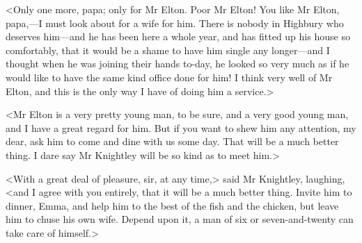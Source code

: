 <Only one more, papa; only for Mr Elton. Poor Mr Elton! You like Mr Elton, papa,—I must look about for a wife for him. There is nobody in Highbury who deserves him—and he has been here a whole year, and has fitted up his house so comfortably, that it would be a shame to have him single any longer—and I thought when he was joining their hands to-day, he looked so very much as if he would like to have the same kind office done for him! I think very well of Mr Elton, and this is the only way I have of doing him a service.>

<Mr Elton is a very pretty young man, to be sure, and a very good young man, and I have a great regard for him. But if you want to shew him any attention, my dear, ask him to come and dine with us some day. That will be a much better thing. I dare say Mr Knightley will be so kind as to meet him.>

<With a great deal of pleasure, sir, at any time,> said Mr Knightley, laughing, <and I agree with you entirely, that it will be a much better thing. Invite him to dinner, Emma, and help him to the best of the fish and the chicken, but leave him to chuse his own wife. Depend upon it, a man of six or seven-and-twenty can take care of himself.>
